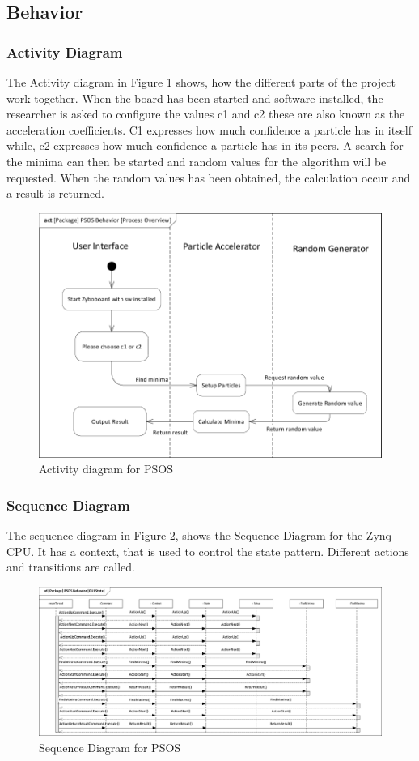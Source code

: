 \subsection{Behavior} \label{requirementspecification:Behavior}

\subsubsection{Activity Diagram}
The Activity diagram in Figure \ref{fig:actpackagepsosbehaviorprocess-overview} shows, how the different parts of the project work together. When the board has been started and software installed, the researcher is asked to configure the values c1 and c2 these are also known as the acceleration coefficients. C1 expresses how much confidence a particle has in itself while, c2 expresses how much confidence a particle has in its peers. A search for the minima can then be started and random values for the algorithm will be requested. When the random values has been obtained, the calculation occur and a result is returned.
\begin{figure}[h]
	\centering
	\includegraphics[width=0.7\linewidth]{"diagram/act_Package_PSOS_Behavior_Process Overview"}
	\caption{Activity diagram for PSOS}
	\label{fig:actpackagepsosbehaviorprocess-overview}
\end{figure}

\subsubsection{Sequence Diagram}
The sequence diagram in Figure \ref{fig:sdpsos}, shows the Sequence Diagram for the Zynq CPU.
It has a context, that is used to control the state pattern. Different actions and transitions are called.

\begin{figure}[H]
	\centering
	\includegraphics[width=1\linewidth]{diagram/sd_psos}
	\caption{Sequence Diagram for PSOS}
	\label{fig:sdpsos}
\end{figure}

